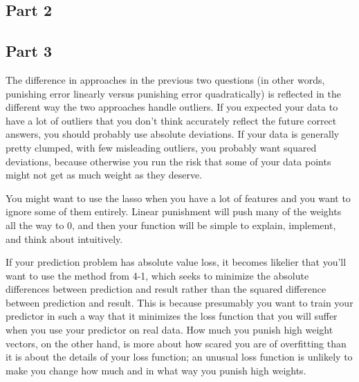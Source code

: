 \documentclass[12pt]{article}
\begin{document}
\subsection{Part 2}


\subsection{Part 3}

The difference in approaches in the previous two questions (in other words, punishing error linearly versus punishing error quadratically) is reflected in the different way the two approaches handle outliers. If you expected your data to have a lot of outliers that you don't think accurately reflect  the future correct answers, you should probably use absolute deviations. If your data is generally pretty clumped, with few misleading outliers, you probably want squared deviations, because otherwise you run the risk that some of your data points might not get as much weight as they deserve. 

You might want to use the lasso when you have a lot of features and you want to ignore some of them entirely. Linear punishment will push many of the weights all the way to 0, and then your function will be simple to explain, implement, and think about intuitively.

If your prediction problem has absolute value loss, it becomes likelier that you'll want to use the method from 4-1, which seeks to minimize the absolute differences between prediction and result rather than the squared difference between prediction and result. This is because presumably you want to train your predictor in such a way that it minimizes the loss function that you will suffer when you use your predictor on real data. How much you punish high weight vectors, on the other hand, is more about how scared you are of overfitting than it is about the details of your loss function; an unusual loss function is unlikely to make you change how much and in what way you punish high weights.
\end{document}

